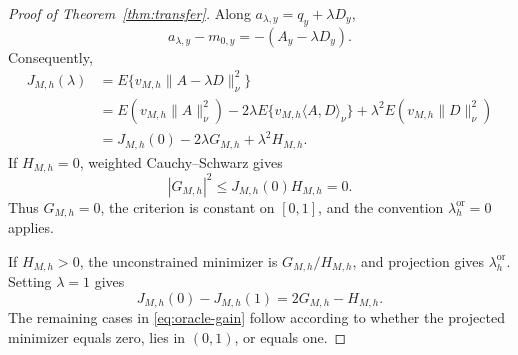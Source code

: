 \begin{proof}[Proof of Theorem~\ref{thm:transfer}]
Along \(a_{\lambda,y}=q_y+\lambda D_y\),
\[
a_{\lambda,y}-m_{0,y}=-(A_y-\lambda D_y).
\]
Consequently,
\[
\begin{aligned}
J_{M,h}(\lambda)
&=E\{v_{M,h}\|A-\lambda D\|_\nu^2\}\\
&=E(v_{M,h}\|A\|_\nu^2)
-2\lambda E\{v_{M,h}\langle A,D\rangle_\nu\}
+\lambda^2E(v_{M,h}\|D\|_\nu^2)\\
&=J_{M,h}(0)-2\lambda G_{M,h}+\lambda^2H_{M,h}.
\end{aligned}
\]
If \(H_{M,h}=0\), weighted Cauchy--Schwarz gives
\[
|G_{M,h}|^2
\le
J_{M,h}(0)H_{M,h}=0.
\]
Thus \(G_{M,h}=0\), the criterion is constant on \([0,1]\), and the convention \(\lambda_h^{\mathrm{or}}=0\) applies.

If \(H_{M,h}>0\), the unconstrained minimizer is \(G_{M,h}/H_{M,h}\), and projection gives \(\lambda_h^{\mathrm{or}}\). Setting \(\lambda=1\) gives
\[
J_{M,h}(0)-J_{M,h}(1)=2G_{M,h}-H_{M,h}.
\]
The remaining cases in \eqref{eq:oracle-gain} follow according to whether the projected minimizer equals zero, lies in \((0,1)\), or equals one.
\end{proof}
